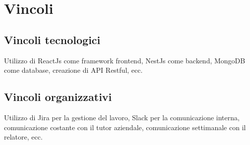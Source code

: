 \section{Vincoli}
\label{sez:vincoli}

\subsection{Vincoli tecnologici}
\label{subsec:vincoli-tecnologici}

Utilizzo di ReactJs come framework frontend, NestJs come backend, MongoDB come database, creazione di API Restful, ecc.

\subsection{Vincoli organizzativi}
\label{subsec:vincoli-organizzativi}

Utilizzo di Jira per la gestione del lavoro, Slack per la comunicazione interna, comunicazione costante con il tutor aziendale, comunicazione settimanale con il relatore, ecc.